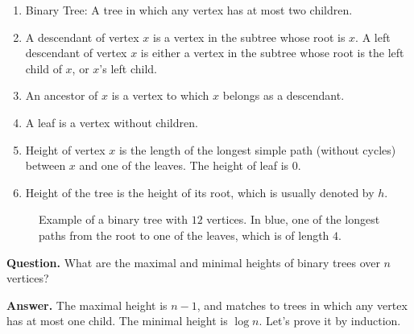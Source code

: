 \begin{framed}
  \begin{definition}\hfill
    \begin{enumerate}
      \item Binary Tree: A tree in which any vertex has at most two children.
      \item A descendant of vertex $x$ is a vertex in the subtree whose root is $x$. A left descendant of vertex $x$ is either a vertex in the subtree whose root is the left child of $x$, or $x$'s left child.
      \item An ancestor of $x$ is a vertex to which $x$ belongs as a descendant.
      \item A leaf is a vertex without children.
      \item Height of vertex $x$ is the length of the longest simple path (without cycles) between $x$ and one of the leaves. The height of leaf is $0$.
      \item Height of the tree is the height of its root, which is usually denoted by $h$.
    \end{enumerate}
  \end{definition}
\end{framed}


    \begin{figure}[h]
      \centering
      
      \caption{ Example of a binary tree with $12$ vertices. In blue, one of the longest paths from the root to one of the leaves, which is of length $4$. }
      \label{fig:<+label+>}
    \end{figure}


    \textbf{Question.} What are the maximal and minimal heights of binary trees over $n$ vertices?
    

    \textbf{Answer.}  The maximal height is $n-1$, and matches to trees in which any vertex has at most one child. The minimal height is $\log n$. Let's prove it by induction. 

